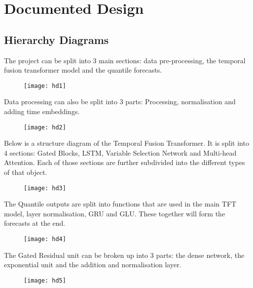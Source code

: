 \documentclass{article}
\begin{document}
\clearpage
\section{Documented Design}
\subsection{Hierarchy Diagrams}
The project can be split into 3 main sections: data pre-processing, the temporal fusion transformer model and the quantile forecasts.
\begin{figure}[H]
    \centering
    \texttt{[image: hd1]}
    \caption{}
\end{figure}
Data processing can also be split into 3 parts: Processing, normalisation and adding time embeddings.
\begin{figure}[H]
    \centering
    \texttt{[image: hd2]}
    \caption{}
\end{figure}
Below is a structure diagram of the Temporal Fusion Transformer. It is split into 4 sections: Gated Blocks, LSTM, Variable Selection Network and Multi-head Attention. Each of those sections are further subdivided into the different types of that object.
\begin{figure}[H]
    \centering
    \texttt{[image: hd3]}
    \caption{}
\end{figure}
The Quantile outputs are split into functions that are used in the main TFT model, layer normalisation, GRU and GLU. These together will form the forecasts at the end.
\begin{figure}[H]
    \centering
    \texttt{[image: hd4]}
    \caption{}
\end{figure}
The Gated Residual unit can be broken up into 3 parts: the dense network, the exponential unit and the addition and normalisation layer.
\begin{figure}[H]
    \centering
    \texttt{[image: hd5]}
    \caption{}
\end{figure}
\end{document}
